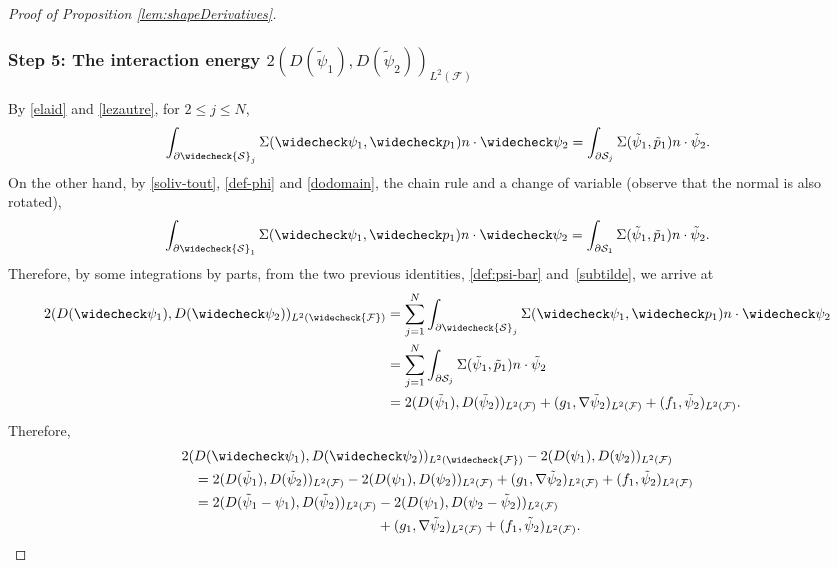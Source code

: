 \documentclass[JEP,XML,SOM,Unicode, NoEqCountersInSection,NoFloatCountersInSection,published]{cedram}
\newcommand{\cS}{\mathcal{S}}
\theoremstyle{definition}
\theoremstyle{remark}
\begin{document}
\begin{proof}[Proof of Proposition \ref{lem:shapeDerivatives}]
\subsubsection*{Step 5: The interaction energy $2(D(\tilde \psi_1), D(\tilde \psi_2))_{L^2(\mathcal F)}$}
By \eqref{elaid} and \eqref{lezautre}, for \hbox{$2\leq j \leq N$},
\begin{equation*}
\int_{\partial \widecheck{\cS}_j}
\Sigma(\widecheck \psi_1,\widecheck p_1) n \cdot \widecheck \psi_2 =
\int_{\partial {\cS}_j}
\Sigma(\tilde \psi_1,\tilde p_1) n \cdot \tilde \psi_2.
\end{equation*}
On the other hand, by \eqref{soliv-tout},
\eqref{def-phi} and
\eqref{dodomain}, the chain rule and a change of variable (observe that the normal is also rotated),
\begin{equation*}
\int_{\partial \widecheck{\cS}_1}
\Sigma(\widecheck \psi_1,\widecheck p_1) n \cdot \widecheck \psi_2 =
\int_{\partial {\cS}_1}
\Sigma(\tilde \psi_1,\tilde p_1) n \cdot \tilde \psi_2.
\end{equation*}
Therefore, by some integrations by parts,
from the two previous identities, \eqref{def:psi-bar} and~\eqref{subtilde}, we arrive at
\begin{align*}
2(D(\widecheck \psi_1), D(\widecheck \psi_2))_{L^2(\widecheck{\mathcal F})}
&= \sum_{j=1}^N \int_{\partial \widecheck{\cS}_j}
\Sigma(\widecheck \psi_1,\widecheck p_1) n \cdot \widecheck \psi_2 \\
&= \sum_{j=1}^N \int_{\partial {\cS}_j}
\Sigma(\tilde \psi_1,\tilde p_1) n \cdot \tilde \psi_2 \\
&= 2(D(\tilde \psi_1), D(\tilde \psi_2))_{L^2(\mathcal F)}
+ (g_1, \nabla \tilde \psi_2)_{L^2(\mathcal F)} + (f_1, \tilde \psi_2)_{L^2(\mathcal F)}.
\end{align*}
Therefore,
\begin{align*}
2(&D(\widecheck \psi_1), D(\widecheck \psi_2))_{L^2(\widecheck{\mathcal F})} - 2(D(\psi_1), D(\psi_2))_{L^2(\mathcal F)}\\
&= 2(D(\tilde \psi_1), D(\tilde \psi_2))_{L^2(\mathcal F)} - 2(D(\psi_1), D(\psi_2))_{L^2(\mathcal F)} + (g_1, \nabla \tilde \psi_2)_{L^2(\mathcal F)} + (f_1, \tilde \psi_2)_{L^2(\mathcal F)}\\
&= 2(D(\tilde \psi_1 - \psi_1), D(\tilde \psi_2))_{L^2(\mathcal F)} - 2(D(\psi_1), D(\psi_2-\tilde \psi_2))_{L^2(\mathcal F)} \\
&\hspace*{4.6cm}+ (g_1, \nabla \tilde \psi_2)_{L^2(\mathcal F)} + (f_1, \tilde \psi_2)_{L^2(\mathcal F)}.

\end{align*}
\end{proof}
\end{document}
